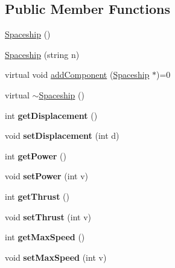 \subsection*{Public Member Functions}
\begin{DoxyCompactItemize}
\item 
\hyperlink{classSpaceship_a13f1c8eb5ded2fb1687203322b22bca9}{Spaceship} ()
\item 
\hyperlink{classSpaceship_a27d48c8aff00407fd50f18522aa5164c}{Spaceship} (string n)
\item 
virtual void \hyperlink{classSpaceship_ac1b4673a691cd100708ddea08cd9f192}{add\+Component} (\hyperlink{classSpaceship}{Spaceship} $\ast$)=0
\item 
virtual \hyperlink{classSpaceship_aaf51352795ea2382e2aaea4b9a058804}{$\sim$\+Spaceship} ()
\item 
\mbox{\label{classSpaceship_a5c2741aa19fc4f38c1507b7c266fad1b}} 
int {\bfseries get\+Displacement} ()
\item 
\mbox{\label{classSpaceship_a689b09969d583d03adcb34073338395a}} 
void {\bfseries set\+Displacement} (int d)
\item 
\mbox{\label{classSpaceship_a4085ec55d3c13c8ba5f63bd8dee4573e}} 
int {\bfseries get\+Power} ()
\item 
\mbox{\label{classSpaceship_ae9697723e1b398c6531a0f48a3145c02}} 
void {\bfseries set\+Power} (int v)
\item 
\mbox{\label{classSpaceship_a080ecccde68594817833a3d62e7f63f0}} 
int {\bfseries get\+Thrust} ()
\item 
\mbox{\label{classSpaceship_a2983f2dc9719e86ac19bdcd12b368f1d}} 
void {\bfseries set\+Thrust} (int v)
\item 
\mbox{\label{classSpaceship_a6d16c208dc343fef047faf23ae1b0d9e}} 
int {\bfseries get\+Max\+Speed} ()
\item 
\mbox{\label{classSpaceship_a81b89e1e8d798bc3de8140f0d37092b1}} 
void {\bfseries set\+Max\+Speed} (int v)
\item 
\mbox{\label{classSpaceship_a60b2e50a33df60c62a712d30b0b75d76}} 

\end{DoxyCompactItemize}
